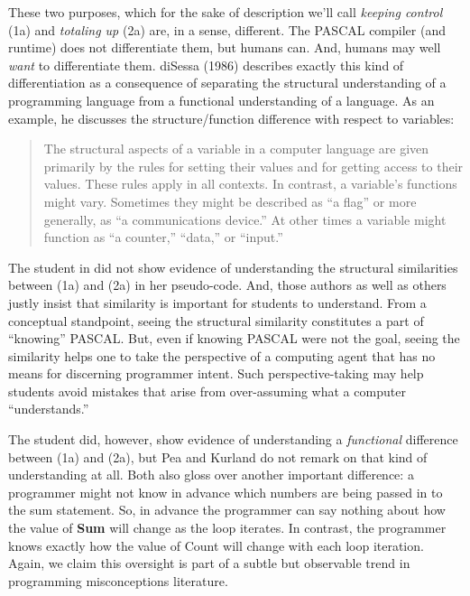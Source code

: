These two purposes, which for the sake of description we'll call
\emph{keeping control} (1a) and \emph{totaling up} (2a) are, in a sense,
different. The PASCAL compiler (and runtime) does not differentiate
them, but humans can. And, humans may well \emph{want} to differentiate
them. diSessa (1986) describes exactly this kind of differentiation as a
consequence of separating the structural understanding of a programming
language from a functional understanding of a language. As an example,
he discusses the structure/function difference with respect to
variables:

\begin{quote}
  The structural aspects of a variable in a computer language are given
  primarily by the rules for setting their values and for getting access
  to their values. These rules apply in all contexts. In contrast, a
  variable's functions might vary. Sometimes they might be described as
  ``a flag'' or more generally, as ``a communications device.'' At other
  times a variable might function as ``a counter,'' ``data,'' or
  ``input.'' \cite{disessa_models_1986}
\end{quote}

The student in \cite{bonar_uncovering_1983} did not show evidence of
understanding the structural similarities between (1a) and (2a) in her
pseudo-code. And, those authors as well as others \cite{pea_cognitive_1983} justly insist that
similarity is important for students to understand. From a conceptual
standpoint, seeing the structural similarity constitutes a part of
``knowing'' PASCAL. But, even if knowing PASCAL were not the goal,
seeing the similarity helps one to take the perspective of a computing
agent that has no means for discerning programmer intent. Such
perspective-taking may help students avoid mistakes that arise from
over-assuming what a computer ``understands.''

The student did, however, show evidence of understanding a \emph{functional} \cite{disessa_models_1986} difference
between (1a) and (2a), but Pea and Kurland do not remark on that kind of
understanding at all. Both \cite{pea_cognitive_1983,bonar_uncovering_1983} also gloss over another
important difference: a programmer might not know in advance which
numbers are being passed in to the sum statement. So, in advance the
programmer can say nothing about how the value of \textbf{Sum} will
change as the loop iterates. In contrast, the programmer knows exactly
how the value of Count will change with each loop iteration. Again, we
claim this oversight is part of a subtle but observable trend in
programming misconceptions literature.

